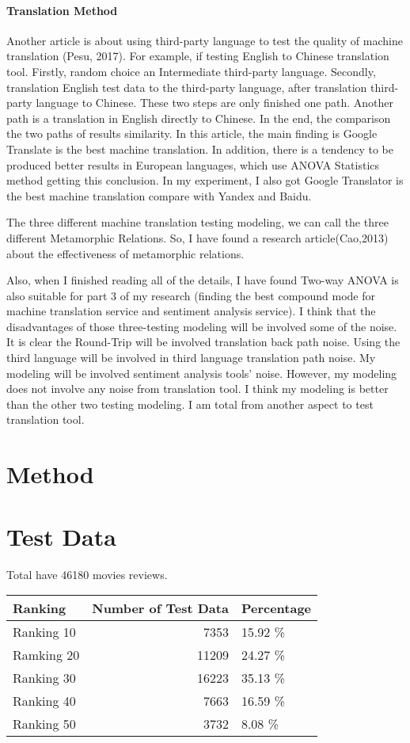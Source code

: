 \documentclass[conference]{IEEEtran}
\begin{document}
\paragraph{Translation Method}
Another article is about using third-party language to test the quality of machine
translation (Pesu, 2017). For example, if testing English to Chinese translation
tool. Firstly, random choice an Intermediate third-party language. Secondly,
translation English test data to the third-party language, after translation
third-party language to Chinese. These two steps are only finished one path.
Another path is a translation in English directly to Chinese. In the end, the
comparison the two paths of results similarity. In this article, the main
finding is Google Translate is the best machine translation. In addition, there
is a tendency to be produced better results in European languages, which use
ANOVA Statistics method getting this conclusion. In my experiment, I also got
Google Translator is the best machine translation compare with Yandex and Baidu.

The three different machine translation testing modeling, we can call the three
different Metamorphic Relations. So, I have found a research article(Cao,2013)
about the effectiveness of metamorphic relations.

Also, when I finished reading all of the details, I have found Two-way ANOVA is also suitable for part 3 of my research (finding the best compound mode for machine translation service and sentiment analysis service).
I think that the disadvantages of those three-testing modeling will be involved some of the noise.
 It is clear the Round-Trip will be involved translation back path noise. Using the third language will be involved in third language translation path noise. My modeling will be involved sentiment analysis tools’ noise. However, my modeling does not involve any noise from translation tool. I think my modeling is better than the other two testing modeling. I am total from another aspect to test translation tool.


\section{Method}
\section{Test Data}
Total have 46180 movies reviews.
\begin{tabular}{lrl}
Ranking & Number of Test Data & Percentage\\
\hline
Ranking 10 & 7353 & 15.92 \%\\
Ramking 20 & 11209 & 24.27 \%\\
Ranking 30 & 16223 & 35.13 \%\\
Ranking 40 & 7663 & 16.59 \%\\
Ranking 50 & 3732 & 8.08 \%\\
\end{tabular}
\end{document}
